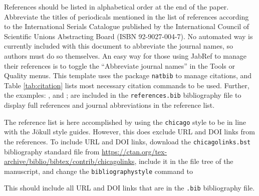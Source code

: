 \documentclass{jokull}
\begin{document}
References should be listed in alphabetical order at the end of the paper. Abbreviate the titles of periodicals mentioned in the list of references according to the International Serials Catalogue published by the International Council of Scientific Unions Abstracting Board (ISBN 92-9027-004-7). No automated way is currently included with this document to abbreviate the journal names, so authors must do so themselves. An easy way for those using JabRef to manage their references is to toggle the ``Abbreviate journal names'' in the Tools or Quality menus. This template uses the package \verb"natbib" to manage citations, and Table \ref{tab:citation} lists most necessary citation commands to be used. Further, the examples: \citep{Adalgeirsdottir_etal_2005}, \citep{Arnadottir_etal_2004} and \citep{Ingolfsson_etal_2016}; are included in the \verb"references.bib" bibliography file to display full references and journal abbreviations in the reference list.

The reference list is here accomplished by using the \verb"chicago" style to be in line with the Jökull style guides. However, this does exclude URL and DOI links from the references. To include URL and DOI links, download the \verb"chicagolinks.bst" bibliography standard file from \url{https://ctan.org/tex-archive/biblio/bibtex/contrib/chicagolinks}, include it in the file tree of the manuscript, and change the \verb"bibliographystyle" command to
\begin{quote}
    \verb""
\end{quote}
This should include all URL and DOI links that are in the \verb".bib" bibliography file.






\end{document}
